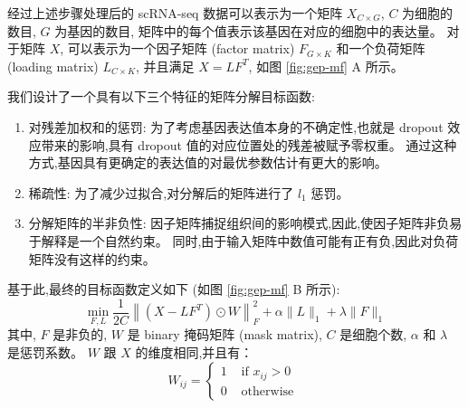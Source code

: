 经过上述步骤处理后的 scRNA-seq 数据可以表示为一个矩阵 $X_{C \times G}$, $C$ 为细胞的数目, $G$ 为基因的数目, 
矩阵中的每个值表示该基因在对应的细胞中的表达量。
对于矩阵 $X$, 可以表示为一个因子矩阵 (factor matrix) $F_{G \times K}$ 和一个负荷矩阵 (loading matrix) $L_{C \times K}$,
并且满足 $X=LF^T$, 如图 \ref{fig:gep-mf} A 所示。 

我们设计了一个具有以下三个特征的矩阵分解目标函数:
\begin{enumerate}[label=(\arabic*),itemindent=2em]
    \item 对残差加权和的惩罚: 为了考虑基因表达值本身的不确定性,也就是 dropout 效应带来的影响,具有 dropout 值的对应位置处的残差被赋予零权重。
          通过这种方式,基因具有更确定的表达值的对最优参数估计有更大的影响。
    \item 稀疏性: 为了减少过拟合,对分解后的矩阵进行了 $l_1$ 惩罚。
    \item 分解矩阵的半非负性: 因子矩阵捕捉组织间的影响模式,因此,使因子矩阵非负易于解释是一个自然约束。
          同时,由于输入矩阵中数值可能有正有负,因此对负荷矩阵没有这样的约束。
\end{enumerate}
基于此,最终的目标函数定义如下 (如图 \ref{fig:gep-mf} B 所示):
\begin{equation}
    \label{eq:obj}
    \min _{F, L} \frac{1}{2 C}\left\|\left(X-L F^{T}\right) \odot W\right\|_{F}^{2}+\alpha\|L\|_{1}+\lambda\|F\|_{1}
\end{equation}
其中, $F$ 是非负的, $W$ 是 binary 掩码矩阵 (mask matrix), $C$ 是细胞个数,
 $\alpha$ 和 $\lambda$ 是惩罚系数。
$W$ 跟 $X$ 的维度相同,并且有：
\begin{equation}
    W_{i j}=\left\{\begin{array}{ll}1 & \text { if } x_{i j}>0 \\ 0 & \text { otherwise }\end{array}\right.
\end{equation}

